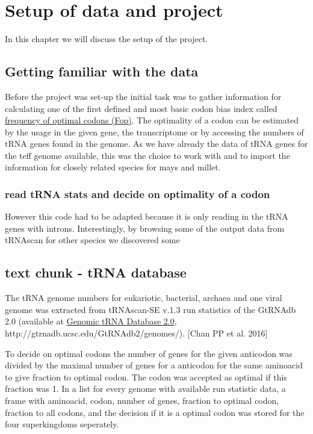 \chapter{Setup of data and project}
In this chapter we will discuss the setup of the project.

\section{Getting familiar with the data}
Before the project was set-up the initial task was to gather information for calculating one of the first defined and most basic codon bias index called \hyperlink{function:Fop}{frequency of optimal codons (Fop)}. The optimality of a codon can be estimated by the usage in the given gene, the transcriptome or by accessing the numbers of tRNA genes found in the genome. As we have already the data of tRNA genes for the teff genome available, this was the choice to work with and to import the information for closely related species for mays and millet.

\subsection{read tRNA stats and decide on optimality of a codon}
  
      
 
However this code had to be adapted because it is only reading in the tRNA genes with introns. Interestingly, by browsing some of the output data from tRNAscan for other species we discovered some 

\section{text chunk - tRNA database}
The tRNA genome numbers for eukariotic, bacterial, archaea and one viral genome was extracted from tRNAscan-SE v.1.3 run statistics of the GtRNAdb 2.0 (available at
\href{http://gtrnadb.ucsc.edu/GtRNAdb2/genomes/}{Genomic tRNA Database 2.0}, http://gtrnadb.ucsc.edu/GtRNAdb2/genomes/). \cite{Chan2016}[Chan PP et al. 2016]

To decide on optimal codons the number of genes for the given anticodon was divided by the maximal number of genes for a anticodon for the same aminoacid to give fraction to optimal codon. The codon was accepted as optimal if this fraction was 1. In a list for every genome with available run statistic data, a frame with aminoacid, codon, number of genes, fraction to optimal codon, fraction to all codons, and the decision if it is a optimal codon was stored for the four superkingdoms seperately.
 
